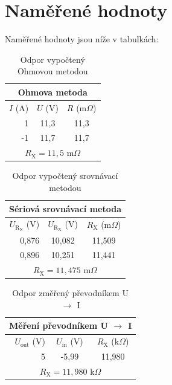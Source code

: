 \documentclass[a4paper,12pt]{article}   %
\newcommand{\tsub}[1]{$_\textrm{#1}$}
\newcommand{\tohm}{$\Omega$}
\newcommand{\var}[2]{$#1_\text{#2}$}
\newcommand{\sub}[1]{_{\text{#1}}}
\newcommand{\rx}{R\sub{X}}
\begin{document}
\section{Naměřené hodnoty}
\label{chap:namerene_hodnoty}
Naměřené hodnoty jsou níže v tabulkách:
\begin{table}[h!]
  \centering
  \begin{tabular}{|r|c|c|}
    \hline
    \multicolumn{3}{|c|}{Ohmova metoda}\\\hline\hline
    $I$ (A)	&	$U$ (V)	&	$R$ (m\tohm)	\\\hline
    1	      &	11,3	  &	11,3	    \\\hline
    -1	    &	11,7	  &	11,7	    \\\hline\hline
    \multicolumn{3}{|c|}{$\rx=11,5$ m\tohm}\\\hline
  \end{tabular}
  \caption{Odpor vypočtený Ohmovou metodou}
  \label{tab:ohm}
\end{table}
\begin{table}[h!]
  \centering
  \begin{tabular}{|r|c|c|}
    \hline
    \multicolumn{3}{|c|}{Sériová srovnávací metoda}\\\hline\hline
    $U\sub{R\tsub{N}}$ (V)	&	$U\sub{R\tsub{X}}$ (V)	&	$R_\text{X}$ (m\tohm)	\\\hline
    0,876   &	10,082	  &	11,509	    \\\hline
    0,896   &	10,251	  &	11,441	    \\\hline\hline
    \multicolumn{3}{|c|}{$\rx=11,475$ m\tohm}\\\hline
  \end{tabular}
  \caption{Odpor vypočtený srovnávací metodou}
  \label{tab:srov}
\end{table}
\begin{table}[h!]
  \centering
  \begin{tabular}{|r|c|c|}
    \hline
    \multicolumn{3}{|c|}{Měření převodníkem U \var{\rightarrow}{} I}\\\hline\hline
    $U\sub{out}$ (V)	&	$U\sub{in}$ (V)	&	$R_\text{X}$ (k\tohm)	\\\hline
    5   &	-5,99	  &	11,980	    \\\hline\hline
    \multicolumn{3}{|c|}{$\rx=11,980$ k\tohm}\\\hline
  \end{tabular}
  \caption{Odpor změřený převodníkem U \var{\rightarrow}{} I}
  \label{tab:prevod}
\end{table}
\end{document}
